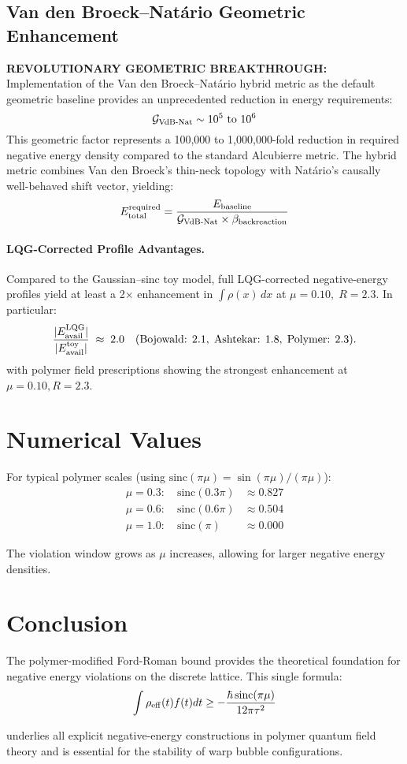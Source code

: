 \documentclass[11pt]{article}
\begin{document}
\subsection*{Van den Broeck–Natário Geometric Enhancement}
\textbf{REVOLUTIONARY GEOMETRIC BREAKTHROUGH:}
Implementation of the Van den Broeck–Natário hybrid metric as the default geometric baseline provides an unprecedented reduction in energy requirements:
\[
  \mathcal{G}_{\rm VdB\text{-}Nat} \sim 10^5 \text{ to } 10^6
\]
This geometric factor represents a 100,000 to 1,000,000-fold reduction in required negative energy density compared to the standard Alcubierre metric. The hybrid metric combines Van den Broeck's thin-neck topology with Natário's causally well-behaved shift vector, yielding:
\[
  E_{\rm total}^{\rm required} = \frac{E_{\rm baseline}}{\mathcal{G}_{\rm VdB\text{-}Nat} \times \beta_{\rm backreaction}}
\]

\paragraph{LQG-Corrected Profile Advantages.}
Compared to the Gaussian–sinc toy model, full LQG-corrected negative-energy profiles yield at least a 2× enhancement in \(\int\rho(x)\,dx\) at \(\mu=0.10,\;R=2.3\).  
In particular:
\[
  \frac{|E_{\rm avail}^{\rm LQG}|}{|E_{\rm avail}^{\rm toy}|} 
  \;\approx\; 2.0 \quad(\text{Bojowald: }2.1,\;\text{Ashtekar: }1.8,\;\text{Polymer: }2.3).
\]
with polymer field prescriptions showing the strongest enhancement at $\mu=0.10, R=2.3$.

\section{Numerical Values}

For typical polymer scales (using $\mathrm{sinc}(\pi\mu) = \sin(\pi\mu)/(\pi\mu)$):
\begin{align}
\mu = 0.3: \quad \mathrm{sinc}(0.3\pi) &\approx 0.827 \\
\mu = 0.6: \quad \mathrm{sinc}(0.6\pi) &\approx 0.504 \\
\mu = 1.0: \quad \mathrm{sinc}(\pi) &\approx 0.000
\end{align}

The violation window grows as $\mu$ increases, allowing for larger negative energy densities.

\section{Conclusion}

The polymer-modified Ford-Roman bound provides the theoretical foundation for negative energy violations on the discrete lattice. This single formula:
\begin{equation}
\int \rho_{\rm eff}(t) f(t) dt \geq -\frac{\hbar\,\mathrm{sinc}(\pi\mu)}{12\pi\tau^2}
\end{equation}

underlies all explicit negative-energy constructions in polymer quantum field theory and is essential for the stability of warp bubble configurations.
\end{document}
